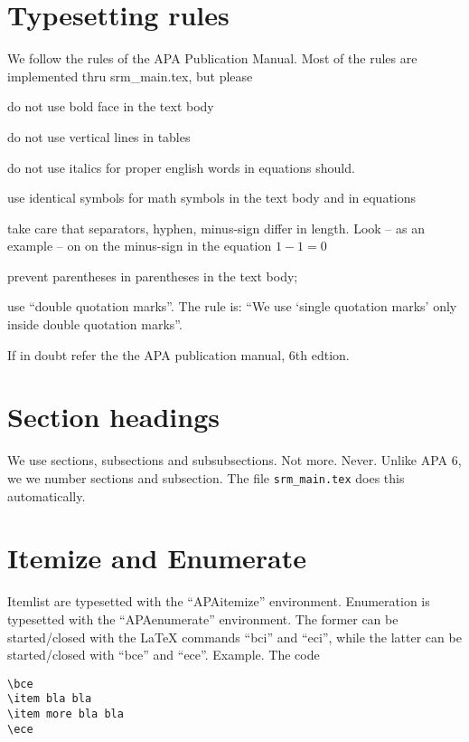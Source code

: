 \section{Typesetting rules}

We follow the rules of the APA Publication Manual. Most of the rules
are implemented thru srm\_main.tex, but please


\bci
\item do not use bold face in the text body
\item do not use vertical lines in tables
\item do not use italics for proper english words in equations should.
\item use identical symbols for math symbols in the text body and in equations
\item take care that separators, hyphen, minus-sign differ in
  length. Look -- as an example -- on on the minus-sign in the equation $1-1=0$
\item prevent parentheses in parentheses in the text body; 
\item use ``double quotation marks''. The rule is: ``We use `single
  quotation marks' only inside  double quotation marks''.
\eci

If in doubt  refer the the APA publication manual, 6th edtion.


\section{Section headings}

We use sections, subsections and subsubsections. Not
more. Never. Unlike APA 6, we we number sections and subsection. The
file \texttt{srm\_main.tex} does this automatically.

\section{Itemize and Enumerate}


Itemlist are typesetted with the ``APAitemize''
environment. Enumeration is typesetted with the ``APAenumerate''
environment. The former can be started/closed with the LaTeX commands
``bci'' and ``eci'', while the latter can be started/closed with
``bce'' and ``ece''. Example. The code

\begin{scriptsize}
\begin{verbatim}
\bce
\item bla bla
\item more bla bla
\ece
\end{verbatim}
\end{scriptsize}

